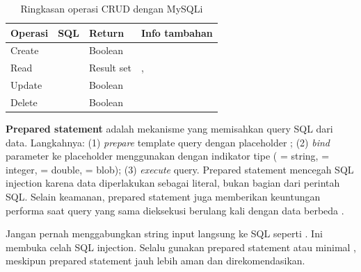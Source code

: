 \begin{table}[ht]
\centering
\begin{tabular}{|P{2cm}|P{3cm}|P{3cm}|P{4cm}|}
\hline
\textbf{Operasi} & \textbf{SQL} & \textbf{Return} & \textbf{Info tambahan} \\
\hline
Create &  & Boolean &  \\
\hline
Read &  & Result set & ,  \\
\hline
Update &  & Boolean &  \\
\hline
Delete &  & Boolean &  \\
\hline
\end{tabular}
\caption{Ringkasan operasi CRUD dengan MySQLi}
\end{table}

\textbf{Prepared statement} adalah mekanisme yang memisahkan query SQL dari data. Langkahnya: (1) \textit{prepare} template query dengan placeholder ; (2) \textit{bind} parameter ke placeholder menggunakan  dengan indikator tipe ( = string,  = integer,  = double,  = blob); (3) \textit{execute} query. Prepared statement mencegah SQL injection karena data diperlakukan sebagai literal, bukan bagian dari perintah SQL. Selain keamanan, prepared statement juga memberikan keuntungan performa saat query yang sama dieksekusi berulang kali dengan data berbeda \cite{phpRightWay}.

\begin{catatan}
Jangan pernah menggabungkan string input langsung ke SQL seperti . Ini membuka celah SQL injection. Selalu gunakan prepared statement atau minimal , meskipun prepared statement jauh lebih aman dan direkomendasikan.
\end{catatan}

